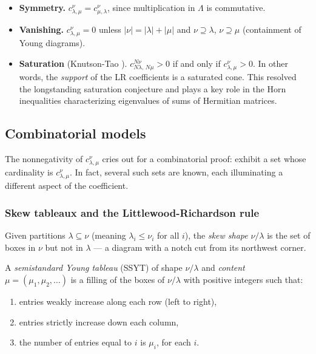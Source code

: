 \begin{itemize}
\item \textbf{Symmetry.}
$c^{\nu}_{\lambda,\mu} = c^{\nu}_{\mu,\lambda}$, since multiplication
in $\Lambda$ is commutative.

\item \textbf{Vanishing.}
$c^{\nu}_{\lambda,\mu} = 0$ unless $|\nu| = |\lambda| + |\mu|$ and
$\nu \supseteq \lambda$, $\nu \supseteq \mu$ (containment of Young
diagrams).

\item \textbf{Saturation} (Knutson-Tao \cite{knutson-tao-1999}).
$c^{N\nu}_{N\lambda,\, N\mu} > 0$ if and only if
$c^{\nu}_{\lambda,\mu} > 0$.  In other words, the \emph{support} of
the LR coefficients is a saturated cone.  This resolved the
longstanding saturation conjecture and plays a key role in the Horn
inequalities characterizing eigenvalues of sums of Hermitian matrices.
\end{itemize}


\subsection{Combinatorial models}
\label{sec:classical-models}

The nonnegativity of $c^{\nu}_{\lambda,\mu}$ cries out for a
combinatorial proof: exhibit a set whose cardinality is
$c^{\nu}_{\lambda,\mu}$.  In fact, several such sets are known, each
illuminating a different aspect of the coefficient.

\subsubsection*{Skew tableaux and the Littlewood-Richardson rule}

Given partitions $\lambda \subseteq \nu$ (meaning $\lambda_i \le
\nu_i$ for all $i$), the \emph{skew shape} $\nu/\lambda$ is the set
of boxes in $\nu$ but not in $\lambda$ --- a diagram with a notch cut
from its northwest corner.

\begin{definition}
A \emph{semistandard Young tableau} (SSYT) of shape $\nu/\lambda$ and
\emph{content} $\mu = (\mu_1, \mu_2, \ldots)$ is a filling of the
boxes of $\nu/\lambda$ with positive integers such that:
\begin{enumerate}
\item[(i)] entries weakly increase along each row (left to right),
\item[(ii)] entries strictly increase down each column,
\item[(iii)] the number of entries equal to $i$ is $\mu_i$, for each $i$.
\end{enumerate}
\end{definition}

